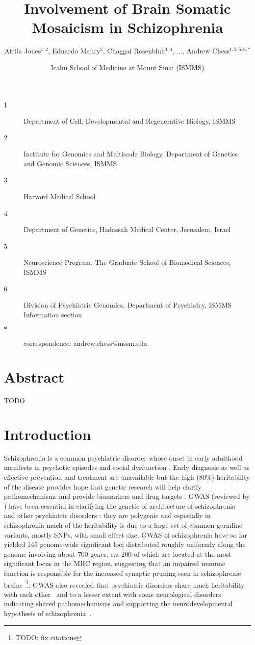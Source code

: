 \documentclass[letterpaper]{article}
\title{Involvement of Brain Somatic Mosaicism in Schizophrenia}
\author{Attila Jones\(^{1,2}\), Eduardo Maury\(^{3}\), Chaggai Rosenbluh\(^{1,4}\), ..., Andrew Chess\(^{1,2,5,6,\ast}\)}
\date{Icahn School of Medicine at Mount Sinai (ISMMS)}
\begin{document}
\maketitle

\begin{description}
\item[1] Department of Cell, Developmental and Regenerative Biology, ISMMS 
\item[2] Institute for Genomics and Multiscale Biology, Department of Genetics and Genomic Sciences, ISMMS 
\item[3] Harvard Medical School
\item[4] Department of Genetics, Hadassah Medical Center, Jerusalem, Israel
\item[5] Neuroscience Program, The Graduate School of Biomedical Sciences, ISMMS 
\item[6] Division of Psychiatric Genomics, Department of Psychiatry, ISMMS 
Information section
\item[\(\ast\)] correspondence: andrew.chess@mssm.edu 
\end{description}

\clearpage

\section*{Abstract}

TODO

\section*{Introduction}

Schizophrenia is a common psychiatric disorder whose onset in early adulthood
manifests in psychotic episodes and social dysfunction \citep{Kahn2015}.
Early diagnosis as well as effective prevention and treatment are unavailable
but the high (80\%) heritability of the disease provides hope that genetic
research will help clarify pathomechanisms and provide biomarkers and drug
targets \citep{Breen2016,Foley2017}.  GWAS (reviewed by \cite{Visscher2017})
have been essential in clarifying the genetic of architecture of
schizophrenia~\citep{Ripke2014,Pardinas2018} and other psychiatric disorders
\citep{Sullivan2012}: they are polygenic and especially in schizophrenia much
of the heritability is due to a large set of common germline variants, mostly
SNPs, with small effect size.  GWAS of schizophrenia have so far yielded 145
genome-wide significant loci distributed roughly uniformly along the genome
involving about 700 genes, c.a 200 of which are located at the most
significant locus in the MHC region, suggesting that an impaired immune
function is responsible for the increased synaptic pruning seen in
schizophrenic brains~\citep{Sekar2016a}\footnote{TODO: fix citations}.  GWAS
also revealed that psychiatric disorders share much heritability with each
other~\citep{Consortium2009,PsychiatricGenomicsConsortium2013} and to a lesser
extent with some neurological disorders~\citep{Consortium2018} indicating
shared pathomechanisms and supporting the neurodevelopmental hypothesis of
schizophrenia~\citep{Nour2015}.
\end{document}
